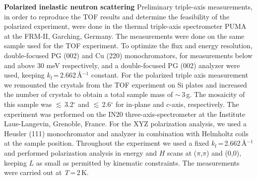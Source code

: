 \documentclass[twocolumn,prb,aps,showpacs]{revtex4-1}
\begin{document}
\vspace{10 pt}
\noindent
{\bf Polarized inelastic neutron scattering}
Preliminary triple-axis measurements, in order to reproduce the TOF results and determine the feasibility of the polarized experiment, were done in the thermal triple-axis spectrometer PUMA at the FRM-II, Garching, Germany. The measurements were done on the same sample used for the TOF experiment. To optimize the flux and energy resolution, double-focused PG (002) and Cu (220) monochromators, for measurements below and above 30 meV respectively, and a double-focused PG (002) analyzer were used, keeping $k_{\mathrm f}$\,=\,2.662\,\AA$^{-1}$ constant.
For the polarized triple axis measurement we remounted the crystals from the TOF experiment on Si plates and increased the number of crystals to obtain a total sample mass of $\sim$\,3\,g. The mosaicity of this sample was  $\lesssim$\,3.2$^\circ$ and  $\lesssim$\,2.6$^\circ$ for in-plane and $c$-axis, respectively. The experiment was performed on the IN20 three-axis-spectrometer at the Institute Laue-Langevin, Grenoble, France. For the XYZ polarization analysis, we used a Heusler (111) monochromator and analyzer in combination with Helmholtz coils at the sample position. Throughout the experiment we used a fixed $k_{\mathrm f}$\,=\,2.662\,\AA$^{-1}$ and performed polarization analysis in energy and $H$ scans at ($\pi$,$\pi$) and (0,0), keeping $L$ as small as permitted by kinematic constraints. The measurements were carried out at {\it T}\,=\,2\,K.
 


\end{document}
